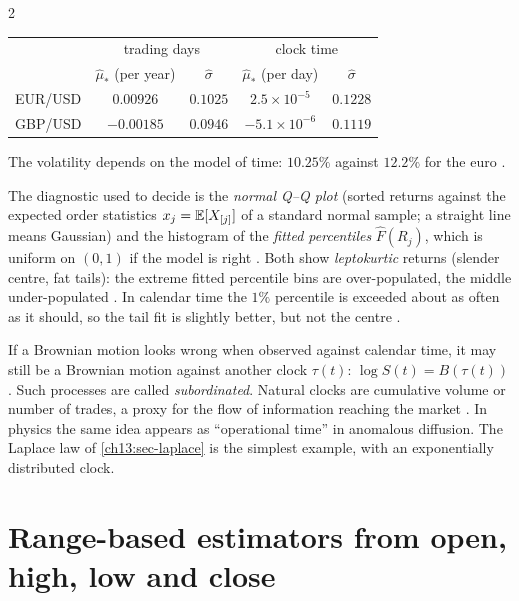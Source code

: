 \begin{paracol}{2}
\begin{secondary}
\begin{center}\small
\begin{tabular}{@{}lcccc@{}}
\toprule
 & \multicolumn{2}{c}{trading days} & \multicolumn{2}{c}{clock time}\\
 & $\hat\mu_*$ (per year) & $\hat\sigma$ & $\hat\mu_*$ (per day) & $\hat\sigma$\\
\midrule
EUR/USD & $0.00926$ & $0.1025$ & $2.5\times10^{-5}$ & $0.1228$\\
GBP/USD & $-0.00185$ & $0.0946$ & $-5.1\times10^{-6}$ & $0.1119$\\
\bottomrule
\end{tabular}
\end{center}
\end{secondary}
The volatility depends on the model of time: $10.25\%$ against $12.2\%$ for the euro .
\begin{secondary}
The
diagnostic used to decide is the \emph{normal Q--Q plot} (sorted returns against the expected order statistics
$x_j=\mathbb{E}[X_{[j]}]$ of a standard normal sample; a straight line means Gaussian) and the histogram of the \emph{fitted percentiles}
$\hat F(R_j)$, which is uniform on $(0,1)$ if the model is right . Both show
\emph{leptokurtic} returns (slender centre, fat tails): the extreme fitted percentile bins are over-populated, the middle
under-populated . In calendar time the $1\%$ percentile is exceeded about as often as it should, so the
tail fit is slightly better, but not the centre .
\end{secondary}

\begin{intuition}\label{ch13:int-clock}
If a Brownian motion looks wrong when observed against calendar time, it may still be a Brownian motion against another
clock $\tau(t)$: $\log S(t)=B(\tau(t))$. Such processes are called \emph{subordinated}. Natural clocks are
cumulative volume or number of trades, a proxy for the flow of information reaching the market
. In physics the same idea appears as ``operational time'' in anomalous diffusion. The Laplace law of
\cref{ch13:sec-laplace} is the simplest example, with an exponentially distributed clock.
\end{intuition}

\section{Range-based estimators from open, high, low and close}\label{ch13:sec-ohlc}


\end{paracol}
